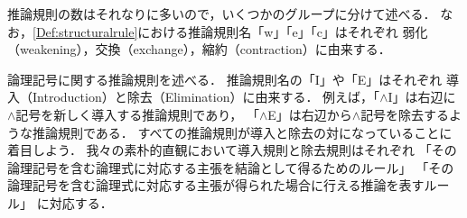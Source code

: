 推論規則の数はそれなりに多いので，いくつかのグループに分けて述べる．
なお，\cref{Def:structuralrule}における推論規則名「w」「e」「c」はそれぞれ
弱化（weakening），交換（exchange），縮約（contraction）に由来する．


論理記号に関する推論規則を述べる．
推論規則名の「I」や「E」はそれぞれ
導入（Introduction）と除去（Elimination）に由来する．
例えば，「\(\land\)I」は右辺に\(\land\)記号を新しく導入する推論規則であり，
「\(\land\)E」は右辺から\(\land\)記号を除去するような推論規則である．
すべての推論規則が導入と除去の対になっていることに着目しよう．
我々の素朴的直観において導入規則と除去規則はそれぞれ
「その論理記号を含む論理式に対応する主張を結論として得るためのルール」
「その論理記号を含む論理式に対応する主張が得られた場合に行える推論を表すルール」
に対応する．


